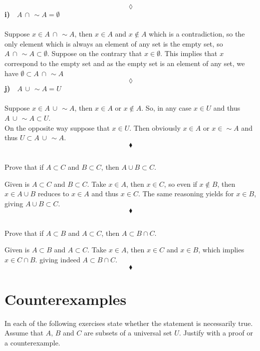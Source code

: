 $$\lozenge$$
\textbf{i)}$\quad A\, \cap \, \sim A = \emptyset$\\\\
 Suppose $x\in A\, \cap \, \sim A$, then $x \in A$ and $x \not\in A$ which is a contradiction, so the only element which is always an element of any set is the empty set, so $ A\, \cap \, \sim A \subset \emptyset$. Suppose on the contrary that $x\in\emptyset$. This implies that $x$ correspond to the empty set and as the empty set is an element of any set, we have  $\emptyset \subset A\, \cap \, \sim A  $
$$\lozenge$$
\textbf{j)}$\quad A\, \cup \, \sim A = U$\\\\
 Suppose $x\in A\, \cup \, \sim A$, then $x \in A$ or $x \not\in A$. So, in any case $x\in U$ and thus $A\, \cup \, \sim A \subset U$.\\
 On the opposite way  suppose that $x\in U$. Then obviously $x\in A$ or $x\in \sim A$ and thus $U\subset A\, \cup \, \sim A$.
$$\blacklozenge$$

\subsection{}
\begin{tcolorbox}
Prove that if $ A\subset C$ and $B\subset C$, then $ A\cup B \subset C$.
\end{tcolorbox}
Given is $A\subset C$ and  $B\subset C$. Take $x\in A$, then $x\in C$, so even if $x\not\in B$, then $x\in A\cup B$ reduces to $x\in A$ and thus $x\in C$. The same reasoning yields for $x\in B$, giving $ A\cup B \subset C$.
$$\blacklozenge$$

\subsection{}
\begin{tcolorbox}
Prove that if $ A\subset B$ and $A\subset C$, then $ A\subset B \cap C$.
\end{tcolorbox}
Given is $A\subset B$ and  $A\subset C$. Take $x\in A$, then $x\in C$ and $x\in B$, which implies $x\in C\cap B$. giving indeed  $ A\subset B \cap C$.
$$\blacklozenge$$
\newpage
 \section{Counterexamples}
 In each of the following exercises state whether the statement is necessarily true. Assume that $A,\, B$ and $C$ are subsets of a universal set $U$. Justify with a proof or a counterexample.
